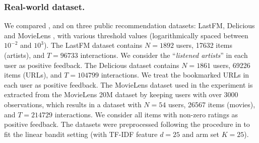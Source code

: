 \subsubsection{Real-world dataset.}
We compared \modelone{}, \modeltwo{} and \modelbaseline{} on three public recommendation datasets: LastFM, Delicious and MovieLens \citep{Cantador:RecSys2011,harper2015movielens}, with various threshold values (logarithmically spaced between $10^{-2}$ and $10^{3}$). 
The LastFM dataset contains $N=1892$ users, 17632 items (artists), and $T=96733$ interactions. We consider the ``\textit{listened artists}'' in each user as positive feedback. The Delicious dataset contains $N=1861$ users, 69226 items (URLs), and $T=104799$ interactions. We treat the bookmarked URLs in each user as positive feedback. 
The MovieLens dataset used in the experiment is extracted from the MovieLens 20M dataset by keeping users with over $3000$ observations, which results in a dataset with $N=54$ users, 26567 items (movies), and $T=214729$ interactions. We consider all items with non-zero ratings as positive feedback. The datasets were preprocessed following the procedure in \cite{cesa2013gang} to fit the linear bandit setting (with TF-IDF feature $d=25$ and arm set $K=25$).

